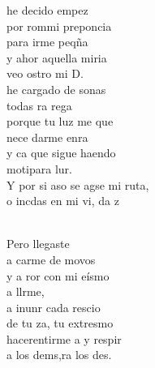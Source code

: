 \documentclass[12pt]{article}
\begin{document}
\begin{multicols*}{2}
\begin{cancion}
	he decido empez\\
	por rommi preponcia \\
	para irme peqña\\
	y ahor aquella miria\\
	veo ostro mi D. \\
\jump
	 he cargado de sonas \\
	todas ra rega\\
	porque tu luz me que \\
	nece darme enra \\
	y ca que sigue haendo \\
	motipara lur. \\
\jump
	Y por si aso se agse mi ruta,\\
	o incdas en mi vi, da z\\\jump\\
	\begin{chorus}%
	Pero llegaste   \\
	a carme de movos\\
	y a ror con mi eísmo\\
	a llrme, \\
	a inunr cada rescio\\
	de tu za, tu extresmo \\
	hacerentirme a y respir \\
	a los dems,ra los des. \\
	\end{chorus}%
	\jump\\
\end{cancion}%


\end{multicols*}
\end{document}
